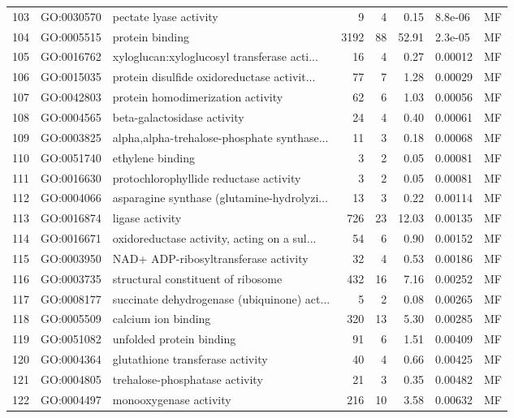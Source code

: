 \documentclass[12pt,oneside,a4paper]{article}
\begin{document}
\begin{longtable}{rllrrrll}
  103 & GO:0030570 & pectate lyase activity &   9 &   4 & 0.15 & 8.8e-06 & MF \\ 
  104 & GO:0005515 & protein binding & 3192 &  88 & 52.91 & 2.3e-05 & MF \\ 
  105 & GO:0016762 & xyloglucan:xyloglucosyl transferase acti... &  16 &   4 & 0.27 & 0.00012 & MF \\ 
  106 & GO:0015035 & protein disulfide oxidoreductase activit... &  77 &   7 & 1.28 & 0.00029 & MF \\ 
  107 & GO:0042803 & protein homodimerization activity &  62 &   6 & 1.03 & 0.00056 & MF \\ 
  108 & GO:0004565 & beta-galactosidase activity &  24 &   4 & 0.40 & 0.00061 & MF \\ 
  109 & GO:0003825 & alpha,alpha-trehalose-phosphate synthase... &  11 &   3 & 0.18 & 0.00068 & MF \\ 
  110 & GO:0051740 & ethylene binding &   3 &   2 & 0.05 & 0.00081 & MF \\ 
  111 & GO:0016630 & protochlorophyllide reductase activity &   3 &   2 & 0.05 & 0.00081 & MF \\ 
  112 & GO:0004066 & asparagine synthase (glutamine-hydrolyzi... &  13 &   3 & 0.22 & 0.00114 & MF \\ 
  113 & GO:0016874 & ligase activity & 726 &  23 & 12.03 & 0.00135 & MF \\ 
  114 & GO:0016671 & oxidoreductase activity, acting on a sul... &  54 &   6 & 0.90 & 0.00152 & MF \\ 
  115 & GO:0003950 & NAD+ ADP-ribosyltransferase activity &  32 &   4 & 0.53 & 0.00186 & MF \\ 
  116 & GO:0003735 & structural constituent of ribosome & 432 &  16 & 7.16 & 0.00252 & MF \\ 
  117 & GO:0008177 & succinate dehydrogenase (ubiquinone) act... &   5 &   2 & 0.08 & 0.00265 & MF \\ 
  118 & GO:0005509 & calcium ion binding & 320 &  13 & 5.30 & 0.00285 & MF \\ 
  119 & GO:0051082 & unfolded protein binding &  91 &   6 & 1.51 & 0.00409 & MF \\ 
  120 & GO:0004364 & glutathione transferase activity &  40 &   4 & 0.66 & 0.00425 & MF \\ 
  121 & GO:0004805 & trehalose-phosphatase activity &  21 &   3 & 0.35 & 0.00482 & MF \\ 
  122 & GO:0004497 & monooxygenase activity & 216 &  10 & 3.58 & 0.00632 & MF \\ 

\end{longtable}
\end{document}

